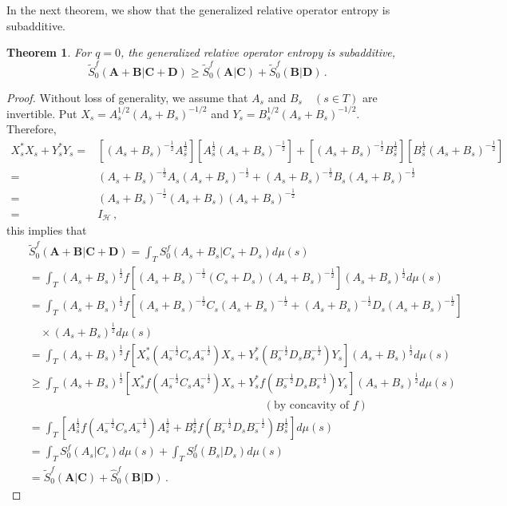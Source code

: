 \documentclass[12pt, reqno]{amsart}
\newtheorem{theorem}{Theorem}[section]
\theoremstyle{definition}
\theoremstyle{remark}
\numberwithin{equation}{section}
\begin{document}
In the next theorem, we show that the generalized relative operator entropy is subadditive.
\begin{theorem}\label{t3}
For $q=0$, the generalized relative operator entropy is subadditive,
$$
\widetilde{S}_0^f(\mathbf{A}+\mathbf{B}|\mathbf{C}+\mathbf{D}) \ge \widetilde{S}_0^f(\mathbf{A}|\mathbf{C})+\widetilde{S}_0^f(\mathbf{B}|\mathbf{D})\,.
$$
\end{theorem}
\begin{proof}
Without loss of generality, we assume that $A_s$ and $B_s\quad(s\in T)$ are invertible. Put $X_s=A_s^{1/2}(A_s+B_s)^{-1/2}$ and $Y_s=B_s^{1/2}(A_s+B_s)^{-1/2}$. Therefore,
{\footnotesize
\begin{align*}
X_s^*X_s+Y_s^*Y_s=&\left[(A_s+B_s)^{-\frac{1}{2}}A_s^{\frac{1}{2}}\right]\left[A_s^{\frac{1}{2}}(A_s+B_s)^{-\frac{1}{2}}\right]
+\left[(A_s+B_s)^{-\frac{1}{2}}B_s^{\frac{1}{2}}\right]\left[B_s^{\frac{1}{2}}(A_s+B_s)^{-\frac{1}{2}}\right]\\
=&(A_s+B_s)^{-\frac{1}{2}}A_s(A_s+B_s)^{-\frac{1}{2}}+(A_s+B_s)^{-\frac{1}{2}}B_s(A_s+B_s)^{-\frac{1}{2}}\\
=&(A_s+B_s)^{-\frac{1}{2}}(A_s+B_s)(A_s+B_s)^{-\frac{1}{2}}\\
=&I_{\mathscr H}\,,
\end{align*}}
this implies that
{\footnotesize
\begin{eqnarray*}
&&\widetilde{S}_0^f(\mathbf{A}+\mathbf{B}|\mathbf{C}+\mathbf{D})=\int_T{S}_0^f(A_s+B_s|C_s+D_s)d\mu(s)\\
&&=\int_T(A_s+B_s)^{\frac{1}{2}} f\left[(A_s+B_s)^{-\frac{1}{2}}(C_s+D_s)(A_s+B_s)^{-\frac{1}{2}}\right](A_s+B_s)^{\frac{1}{2}}d\mu(s)\\
&&=\int_T(A_s+B_s)^{\frac{1}{2}} f\left[(A_s+B_s)^{-\frac{1}{2}}C_s(A_s+B_s)^{-\frac{1}{2}}+(A_s+B_s)^{-\frac{1}{2}}D_s(A_s+B_s)^{-\frac{1}{2}}\right]\\
&&\quad\times(A_s+B_s)^{\frac{1}{2}}d\mu(s)\\
&&=\int_T(A_s+B_s)^{\frac{1}{2}} f\left[X_s^*\left(A_s^{-\frac{1}{2}}C_sA_s^{-\frac{1}{2}}\right)X_s+Y_s^*\left(B_s^{-\frac{1}{2}}D_sB_s^{-\frac{1}{2}}\right)Y_s\right](A_s+B_s)^{\frac{1}{2}}d\mu(s)\\
&& \ge \int_T(A_s+B_s)^{\frac{1}{2}} \left[X_s^*f\left(A_s^{-\frac{1}{2}}C_sA_s^{-\frac{1}{2}}\right)X_s+Y_s^*f\left(B_s^{-\frac{1}{2}}D_sB_s^{-\frac{1}{2}}\right)Y_s\right](A_s+B_s)^{\frac{1}{2}}d\mu(s)\\
&&\qquad \hspace{8cm}(\text{by concavity of }f)\\
&&=\int_T\left[A_s^{\frac{1}{2}}f\left(A_s^{-\frac{1}{2}}C_sA_s^{-\frac{1}{2}}\right)
A_s^{\frac{1}{2}}+B_s^{\frac{1}{2}}f\left(B_s^{-\frac{1}{2}}D_sB_s^{-\frac{1}{2}}\right)B_s^{\frac{1}{2}}\right]d\mu(s)\\
&&= \int_T{S}_0^f(A_s|C_s)d\mu(s)+\int_TS_0^f(B_s|D_s)d\mu(s)\\
&&= \widetilde{S}_0^f(\mathbf{A}|\mathbf{C})+\widehat{S}_0^f(\mathbf{B}|\mathbf{D})\,.
\end{eqnarray*}}
\end{proof}
\end{document}
